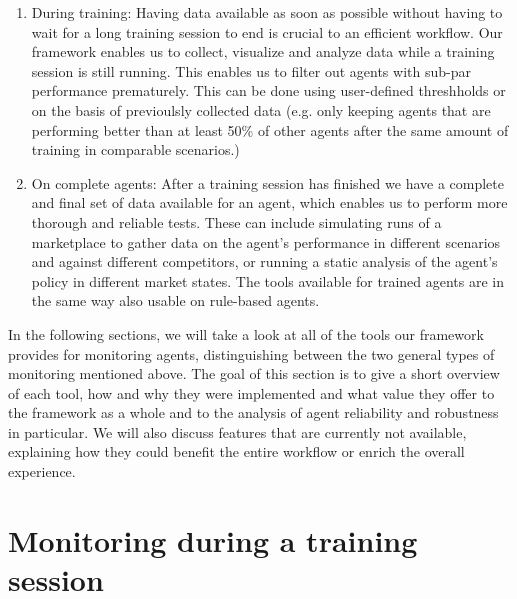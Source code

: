 \begin{enumerate}
	\item During training: Having data available as soon as possible without having to wait for a long training session to end is crucial to an efficient workflow. Our framework enables us to collect, visualize and analyze data while a training session is still running. This enables us to filter out agents with sub-par performance prematurely. This can be done using user-defined threshholds or on the basis of previoulsly collected data (e.g. only keeping agents that are performing better than at least 50\% of other agents after the same amount of training in comparable scenarios.) 

	\item On complete agents: After a training session has finished we have a complete and final set of data available for an agent, which enables us to perform more thorough and reliable tests. These can include simulating runs of a marketplace to gather data on the agent's performance in different scenarios and against different competitors, or running a static analysis of the agent's policy in different market states. The tools available for trained agents are in the same way also usable on rule-based agents.
\end{enumerate}

In the following sections, we will take a look at all of the tools our framework provides for monitoring agents, distinguishing between the two general types of monitoring mentioned above. The goal of this section is to give a short overview of each tool, how and why they were implemented and what value they offer to the framework as a whole and to the analysis of agent reliability and robustness in particular. We will also discuss features that are currently not available, explaining how they could benefit the entire workflow or enrich the overall experience.

\section{Monitoring during a training session}

